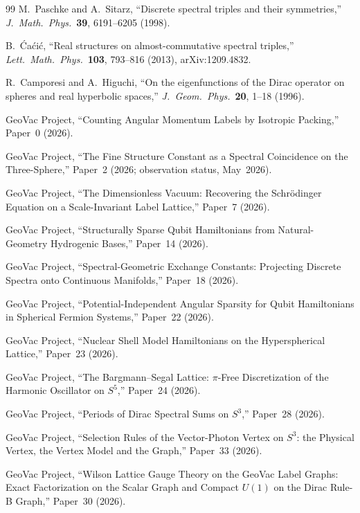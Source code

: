 \documentclass[11pt]{article}
\begin{document}
\begin{thebibliography}{99}
M.~Paschke and A.~Sitarz,
``Discrete spectral triples and their symmetries,''
\textit{J.~Math.~Phys.}\ \textbf{39}, 6191--6205 (1998).

B.~\'Ca\'ci\'c,
``Real structures on almost-commutative spectral triples,''
\textit{Lett.~Math.~Phys.}\ \textbf{103}, 793--816 (2013), arXiv:1209.4832.

R.~Camporesi and A.~Higuchi,
``On the eigenfunctions of the Dirac operator on spheres and real
hyperbolic spaces,''
\textit{J.~Geom.~Phys.}\ \textbf{20}, 1--18 (1996).

GeoVac Project, ``Counting Angular Momentum Labels by Isotropic Packing,'' Paper~0 (2026).

GeoVac Project, ``The Fine Structure Constant as a Spectral
Coincidence on the Three-Sphere,'' Paper~2 (2026; observation status, May~2026).

GeoVac Project, ``The Dimensionless Vacuum: Recovering the
Schr\"odinger Equation on a Scale-Invariant Label Lattice,'' Paper~7 (2026).

GeoVac Project, ``Structurally Sparse Qubit Hamiltonians from Natural-Geometry
Hydrogenic Bases,'' Paper~14 (2026).

GeoVac Project, ``Spectral-Geometric Exchange Constants: Projecting
Discrete Spectra onto Continuous Manifolds,'' Paper~18
(2026).

GeoVac Project, ``Potential-Independent Angular Sparsity for Qubit
Hamiltonians in Spherical Fermion Systems,''
Paper~22 (2026).

GeoVac Project, ``Nuclear Shell Model Hamiltonians on the
Hyperspherical Lattice,'' Paper~23 (2026).

GeoVac Project, ``The Bargmann--Segal Lattice: $\pi$-Free
Discretization of the Harmonic Oscillator on $S^5$,'' Paper~24
(2026).

GeoVac Project, ``Periods of Dirac Spectral Sums on $S^3$,''
Paper~28 (2026).

GeoVac Project, ``Selection Rules of the Vector-Photon Vertex on $S^3$:
the Physical Vertex, the Vertex Model and the Graph,'' Paper~33 (2026).

GeoVac Project, ``Wilson Lattice Gauge Theory on the GeoVac Label
Graphs: Exact Factorization on the Scalar Graph and Compact $U(1)$ on
the Dirac Rule-B Graph,'' Paper~30 (2026).


\end{thebibliography}
\end{document}
